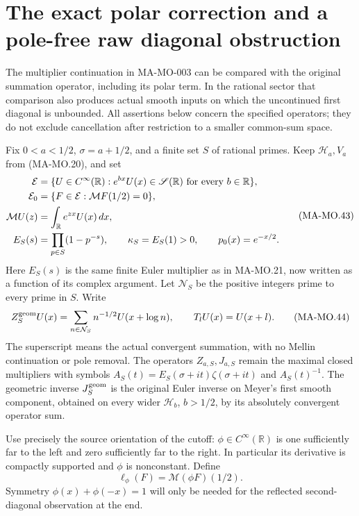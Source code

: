 \section{The exact polar correction and a pole-free raw diagonal obstruction}
\label{sec:euler-polar-identification}

The multiplier continuation in MA-MO-003 can be compared with the
original summation operator, including its polar term. In the rational
sector that comparison also produces actual smooth inputs on which the
uncontinued first diagonal is unbounded. All assertions below concern
the specified operators; they do not exclude cancellation after
restriction to a smaller common-sum space.

Fix \(0<a<1/2\), \(\sigma=a+1/2\), and a finite set \(S\) of rational
primes. Keep \(\mathcal H_a,V_a\) from (MA-MO.20), and set
\[
 \begin{aligned}
 \mathcal E&=\{U\in C^\infty(\mathbb R):e^{bx}U(x)\in
                    \mathscr S(\mathbb R)\ \hbox{for every }b\in\mathbb R\},\\
 \mathcal E_0&=\{F\in\mathcal E:\mathcal MF(1/2)=0\},\\
 \mathcal MU(z)&=\int_{\mathbb R}e^{zx}U(x)\,dx,\\
 E_S(s)&=\prod_{p\in S}(1-p^{-s}),\qquad
 \kappa_S=E_S(1)>0,\qquad p_0(x)=e^{-x/2}.
 \end{aligned}
 \tag{MA-MO.43}
\]
Here \(E_S(s)\) is the same finite Euler multiplier as in MA-MO.21,
now written as a function of its complex argument. Let \(\mathcal N_S\)
be the positive integers prime to every prime in \(S\). Write
\[
 Z_S^{\rm geom}U(x)=\sum_{n\in\mathcal N_S}n^{-1/2}U(x+\log n),
 \qquad T_lU(x)=U(x+l).
 \tag{MA-MO.44}
\]
The superscript means the actual convergent summation, with no Mellin
continuation or pole removal. The operators \(Z_{a,S},J_{a,S}\) remain
the maximal closed multipliers with symbols
\(A_S(t)=E_S(\sigma+it)\zeta(\sigma+it)\) and \(A_S(t)^{-1}\).
The geometric inverse \(J_S^{\rm geom}\) is the original Euler inverse
on Meyer's first smooth component, obtained on every wider
\(\mathcal H_b\), \(b>1/2\), by its absolutely convergent operator sum.

Use precisely the source orientation of the cutoff:
\(\phi\in C^\infty(\mathbb R)\) is one sufficiently far to the left
and zero sufficiently far to the right. In particular its derivative
is compactly supported and \(\phi\) is nonconstant. Define
\[
                 \ell_\phi(F)=\mathcal M(\phi F)(1/2).
 \tag{MA-MO.45}
\]
Symmetry \(\phi(x)+\phi(-x)=1\) will only be needed for the reflected
second-diagonal observation at the end.

